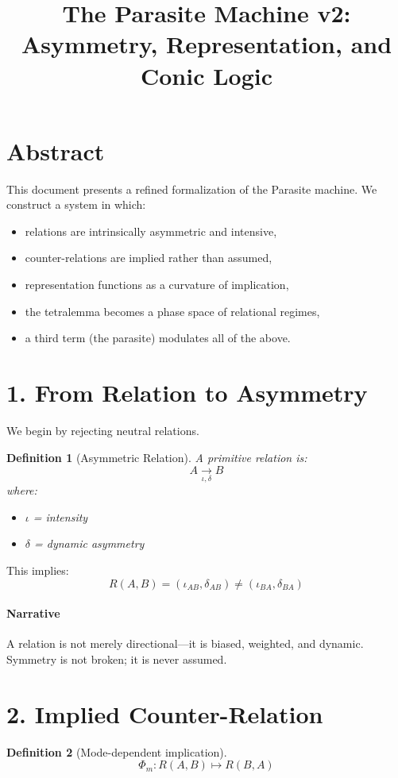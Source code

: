 \documentclass[11pt]{article}
\title{The Parasite Machine v2:\\
Asymmetry, Representation, and Conic Logic}
\author{}
\date{}
\newtheorem{definition}{Definition}
\begin{document}
\maketitle

\section*{Abstract}
This document presents a refined formalization of the Parasite machine.
We construct a system in which:
\begin{itemize}
\item relations are intrinsically asymmetric and intensive,
\item counter-relations are implied rather than assumed,
\item representation functions as a curvature of implication,
\item the tetralemma becomes a phase space of relational regimes,
\item a third term (the parasite) modulates all of the above.
\end{itemize}

\section{1. From Relation to Asymmetry}
We begin by rejecting neutral relations.

\begin{definition}[Asymmetric Relation]
A primitive relation is:
\[
A \xrightarrow[\iota,\delta]{} B
\]
where:
\begin{itemize}
\item $\iota$ = intensity
\item $\delta$ = dynamic asymmetry
\end{itemize}
\end{definition}

\noindent
This implies:
\[
R(A,B) = (\iota_{AB}, \delta_{AB}) \neq (\iota_{BA}, \delta_{BA})
\]

\paragraph{Narrative}
A relation is not merely directional—it is biased, weighted, and dynamic.
Symmetry is not broken; it is never assumed.

\section{2. Implied Counter-Relation}
\begin{definition}[Mode-dependent implication]
\[
\Phi_m : R(A,B) \mapsto R(B,A)
\]
\end{definition}
\end{document}
